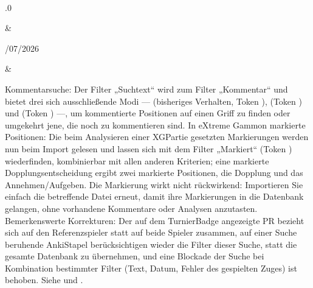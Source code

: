 \documentclass[letterpaper,10pt,german]{sphinxmanual}
\begin{document}
\begin{savenotes}
\begin{longtable}{}
\begin{varwidth}[t]{}
\sphinxbeforeendvarwidth
\end{varwidth}%
\\
\sphinxhline\begin{varwidth}[t]{}
.0
\sphinxbeforeendvarwidth
\end{varwidth}%
&\begin{varwidth}[t]{}
/07/2026
\sphinxbeforeendvarwidth
\end{varwidth}%
&\begin{varwidth}[t]{}
\sphinxAtStartPar
Kommentarsuche: Der Filter „Suchtext“ wird zum Filter „Kommentar“ und bietet drei sich ausschließende Modi —  (bisheriges Verhalten, Token ),  (Token ) und  (Token ) —, um kommentierte Positionen auf einen Griff zu finden oder umgekehrt jene, die noch zu kommentieren sind. In eXtreme Gammon markierte Positionen: Die beim Analysieren einer XG\sphinxhyphen{}Partie gesetzten Markierungen werden nun beim Import gelesen und lassen sich mit dem Filter „Markiert“ (Token ) wiederfinden, kombinierbar mit allen anderen Kriterien; eine markierte Dopplungsentscheidung ergibt zwei markierte Positionen, die Dopplung und das Annehmen/Aufgeben. Die Markierung wirkt nicht rückwirkend: Importieren Sie einfach die betreffende \sphinxhyphen{}Datei erneut, damit ihre Markierungen in die Datenbank gelangen, ohne vorhandene Kommentare oder Analysen anzutasten. Bemerkenswerte Korrekturen: Der auf dem Turnier\sphinxhyphen{}Badge angezeigte PR bezieht sich auf den Referenzspieler statt auf beide Spieler zusammen, auf einer Suche beruhende Anki\sphinxhyphen{}Stapel berücksichtigen wieder die Filter dieser Suche, statt die gesamte Datenbank zu übernehmen, und eine Blockade der Suche bei Kombination bestimmter Filter (Text, Datum, Fehler des gespielten Zuges) ist behoben. Siehe {\hyperref[\detokenize{cmd_mode:cmd-mode}]{}} und {\hyperref[\detokenize{manuel:manuel}]{}}.
\sphinxbeforeendvarwidth
\end{varwidth}%
\\
\sphinxhline\begin{varwidth}[t]{}

\end{varwidth}
\end{longtable}
\end{savenotes}
\end{document}
